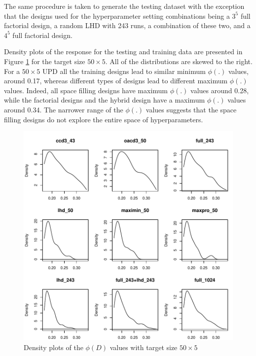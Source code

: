 \documentclass [PhD] {package/uclathes}
\begin{document}
The same procedure is taken to generate the testing dataset with the exception that the designs used for the hyperparameter setting combinations being a $3^5$ full factorial design, a random LHD with 243 runs, a combination of these two, and a $4^5$ full factorial design.

Density plots of the response for the testing and training data are presented in Figure \ref{fig:density} for the target size $50\times 5$.  All of the distributions are skewed to the right. For a $50\times5$ UPD all the training designs lead to similar minimum $\phi(.)$ values, around 0.17, whereas different types of designs lead to different maximum $\phi(.)$ values. Indeed, all space filling designs have  maximum $\phi(.)$ values around 0.28, while the factorial designs and the hybrid design have a maximum $\phi(.)$ values around 0.34. The narrower range of the $\phi(.)$ values suggests that the space filling designs do not explore the entire space of hyperparameters.

\begin{figure}%
    \centering

\includegraphics{chapters/DE/pdfs/density}
  \caption{Density plots of the $\phi(D)$ values with target size $50\times5$}
    \label{fig:density}
\end{figure}
\end{document}
